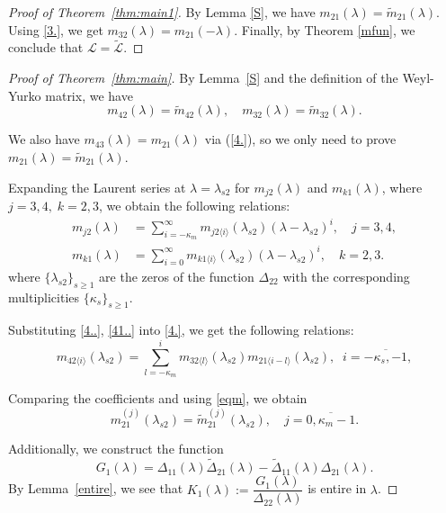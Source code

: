 \documentclass[reqno,12pt,centertags]{amsart}
\numberwithin{equation}{section}
\theoremstyle{definition}
\begin{document}

\begin{proof}[Proof of Theorem~\ref{thm:main1}]
		By Lemma \ref{S}, we have $m_{21}(\lambda)=\tilde{m}_{21}(\lambda)$. Using \eqref{3.}, we get $m_{32}(\lambda)={m}_{21}(-\lambda)$. Finally, by Theorem \ref{mfun},  we conclude that $\mathcal{L}=\tilde{\mathcal{L}}.$
	\end{proof}


\begin{proof}[Proof of Theorem~\ref{thm:main}]
	By Lemma~\ref{S} and the definition of the Weyl-Yurko matrix, we have
\begin{equation} \label{eqm}	
m_{42}(\lambda)=\tilde{m}_{42}(\lambda), \quad m_{32}(\lambda)=\tilde{m}_{32}(\lambda). 
\end{equation}

We also have $m_{43}(\lambda)=m_{21}(\lambda)$ via (\ref{4.}), so we only need to prove $m_{21}(\lambda)=\tilde{m}_{21}(\lambda)$.
	
Expanding the Laurent series at $\lambda=\lambda_{s2}$ for $m_{j2}(\lambda)$ and $m_{k1}(\lambda)$, where $j=3,4,\;k=2,3$, we obtain the following relations:
\begin{align}\label{4..}
		m_{j2}(\lambda)& =\sum_{i=-\kappa_{m}}^{\infty}m_{j2\langle i \rangle}(\lambda_{s2})(\lambda-\lambda_{s2})^i,\quad j=3,4, \\
\label{41..}
m_{k1}(\lambda)& =\sum_{i=0}^{\infty}m_{k1\langle i \rangle}(\lambda_{s2})(\lambda-\lambda_{s2})^i,\quad k=2,3.
\end{align}
where $\{\lambda_{s2}\}_{s\geq1}$ are the zeros of the function $\Delta_{22}$ with the corresponding multiplicities $\{\kappa_{s}\}_{s\geq1}$.
	
Substituting \eqref{4..}, \eqref{41..} into \eqref{4.}, we get the following relations:
\begin{equation*}
	m_{42\langle i\rangle}(\lambda_{s2})=\sum_{l=-\kappa_{m}}^{i}m_{32\langle l\rangle}(\lambda_{s2})m_{21\langle i-l\rangle}(\lambda_{s2}),\;\;i=\overline{-\kappa_{s},-1},
\end{equation*}

Comparing the coefficients and using \eqref{eqm}, we obtain
	\begin{equation*}
		m_{21}^{(j)}(\lambda_{s2})=\tilde{ m}_{21}^{(j)}(\lambda_{s2}),\quad j=\overline{0, \kappa_{m}-1}.
	\end{equation*}
	
	Additionally, we construct the function
	$$G_{1}(\lambda)={\Delta}_{11}(\lambda)\tilde{\Delta}_{21}(\lambda)-\tilde{\Delta}_{11}(\lambda){\Delta}_{21}(\lambda).$$
	By Lemma~\ref{entire}, we  see that $K_{1}(\lambda):=\dfrac{G_1(\lambda)}{\Delta_{22}(\lambda)}$ is entire in $\lambda$.
	

\end{proof}
\end{document}
